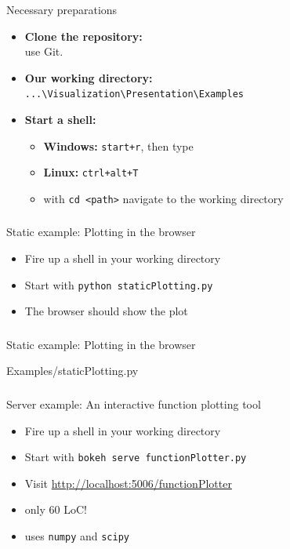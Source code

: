 \documentclass[11pt]{beamer}
\newcommand{\mytexttt}[1]{\colorbox{gray!20}{\texttt{#1}}}
\begin{document}
\begin{frame}
\frametitle{\insertsubsection}
\begin{block}{Necessary preparations}
\begin{itemize}
\item \textbf{Clone the repository:} \\
use Git.
\item \textbf{Our working directory:} \\
\mytexttt{...\textbackslash Visualization\textbackslash Presentation\textbackslash Examples}
\item \textbf{Start a shell:} 
\begin{itemize}
\item \textbf{Windows:} \mytexttt{start+r}, then type 
\item \textbf{Linux:} \mytexttt{ctrl+alt+T}
\item with \mytexttt{cd <path>} navigate to the working directory
\end{itemize}
\end{itemize}
\end{block}
\end{frame}

\begin{frame}[fragile]
\frametitle{\insertsubsection}
\begin{block}{Static example: Plotting in the browser}
\begin{itemize}
\item Fire up a shell in your working directory
\item Start with \mytexttt{python staticPlotting.py}
\item The browser should show the plot
\end{itemize}
\end{block}
\end{frame}

\begin{frame}[fragile]
\frametitle{\insertsubsection}
\begin{block}{Static example: Plotting in the browser}

{Examples/staticPlotting.py}
\end{block}
\end{frame}

\begin{frame}
\frametitle{\insertsubsection}
\begin{block}{Server example: An interactive function plotting tool}
\begin{itemize}
\item Fire up a shell in your working directory
\item Start with \mytexttt{bokeh serve functionPlotter.py}
\item Visit \url{http://localhost:5006/functionPlotter}
\pause
\item only 60 LoC!
\item uses \texttt{numpy} and \texttt{scipy}
\end{itemize}
\end{block}
\end{frame}
\end{document}

